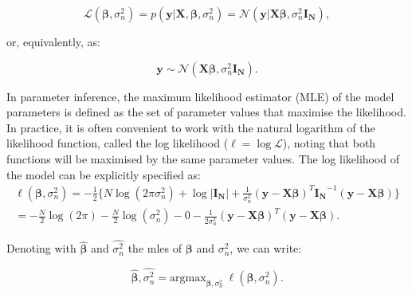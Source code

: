 \begin{equation} \label{eq:Linear_regression_likelihood}
 \mathcal{L}(\boldsymbol{\beta}, \sigma_n^2) = p(\mathbf{y}| \mathbf{X}, \boldsymbol{\beta}, \sigma_n^2) = \mathcal{N}(\mathbf{y} | \mathbf{X}\boldsymbol{\beta}, \sigma_n^2 \mathbf{I_N}),
\end{equation}

\newpage

or, 
equivalently,
as:

\begin{equation} \label{eq:Linear_regression_MVN_form}
\mathbf{y} \sim \mathcal{N}(\mathbf{X}\boldsymbol{\beta}, \sigma_n^2 \mathbf{I_N}). 
\end{equation}

In parameter inference, the maximum likelihood estimator (MLE) of the model parameters is defined as the set of parameter values that maximise the likelihood.
In practice, it is often convenient to work with the natural logarithm of the likelihood function, called the log likelihood ($\ell = \log \mathcal{L}$), noting that both functions will be maximised by the same parameter values.
The log likelihood of the model can be explicitly specified as:\\

\begin{equation} \label{eq:Linear_regression_log_likelihood}
\begin{split}
 \ell(\boldsymbol{\beta}, \sigma_n^2) = -\frac{1}{2} \bigg\{N \log (2\pi\sigma_n^2) + \log |\mathbf{I_N}|+ \frac{1}{\sigma_n^2}(\mathbf{y}-\mathbf{X}\boldsymbol{\beta})^T\mathbf{I_N}^{-1}(\mathbf{y}-\mathbf{X}\boldsymbol{\beta}) \bigg\} \\
= -\frac{N}{2} \log (2\pi) - \frac{N}{2} \log(\sigma_n^2)- 0 - \frac{1}{2\sigma_n^2}(\mathbf{y}-\mathbf{X}\boldsymbol{\beta})^T(\mathbf{y}-\mathbf{X}\boldsymbol{\beta}). 
\end{split}
\end{equation}

Denoting with $\hat{\boldsymbol{\beta}}$ and $\hat{\sigma_n^2}$ the \gls{mle}s of $\boldsymbol{\beta}$ and $\sigma_n^2$, we can write:

\begin{equation} \label{eq:Linear_regression_MLEs}
\hat{\boldsymbol{\beta}},\hat{\sigma_n^2} = \mathrm{argmax}_{\boldsymbol{\beta},\sigma_n^2} \ \ell(\boldsymbol{\beta}, \sigma_n^2). 
\end{equation} 

